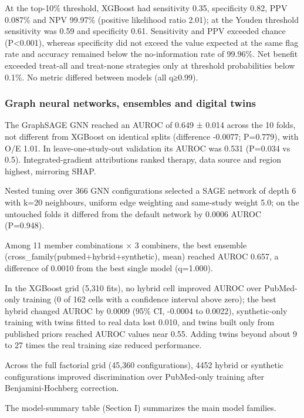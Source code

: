 \documentclass[
  11pt,
]{article}
\begin{document}
At the top-10\% threshold, XGBoost had sensitivity 0.35, specificity
0.82, PPV 0.087\% and NPV 99.97\% (positive likelihood ratio 2.01); at
the Youden threshold sensitivity was 0.59 and specificity 0.61.
Sensitivity and PPV exceeded chance (P\textless0.001), whereas
specificity did not exceed the value expected at the same flag rate and
accuracy remained below the no-information rate of 99.96\%. Net benefit
exceeded treat-all and treat-none strategies only at threshold
probabilities below 0.1\%. No metric differed between models (all
q≥0.99).

\subsubsection{Graph neural networks, ensembles and digital
twins}\label{graph-neural-networks-ensembles-and-digital-twins}

The GraphSAGE GNN reached an AUROC of 0.649 ± 0.014 across the 10 folds,
not different from XGBoost on identical splits (difference -0.0077;
P=0.779), with O/E 1.01. In leave-one-study-out validation its AUROC was
0.531 (P=0.034 vs 0.5). Integrated-gradient attributions ranked therapy,
data source and region highest, mirroring SHAP.

Nested tuning over 366 GNN configurations selected a SAGE network of
depth 6 with k=20 neighbours, uniform edge weighting and same-study
weight 5.0; on the untouched folds it differed from the default network
by 0.0006 AUROC (P=0.948).

Among 11 member combinations × 3 combiners, the best ensemble
(cross\_family(pubmed+hybrid+synthetic), mean) reached AUROC 0.657, a
difference of 0.0010 from the best single model (q=1.000).

In the XGBoost grid (5,310 fits), no hybrid cell improved AUROC over
PubMed-only training (0 of 162 cells with a confidence interval above
zero); the best hybrid changed AUROC by 0.0009 (95\% CI, -0.0004 to
0.0022), synthetic-only training with twins fitted to real data lost
0.010, and twins built only from published priors reached AUROC values
near 0.55. Adding twins beyond about 9 to 27 times the real training
size reduced performance.

Across the full factorial grid (45,360 configurations), 4452 hybrid or
synthetic configurations improved discrimination over PubMed-only
training after Benjamini-Hochberg correction.

The model-summary table (Section I) summarizes the main model families.
\end{document}
